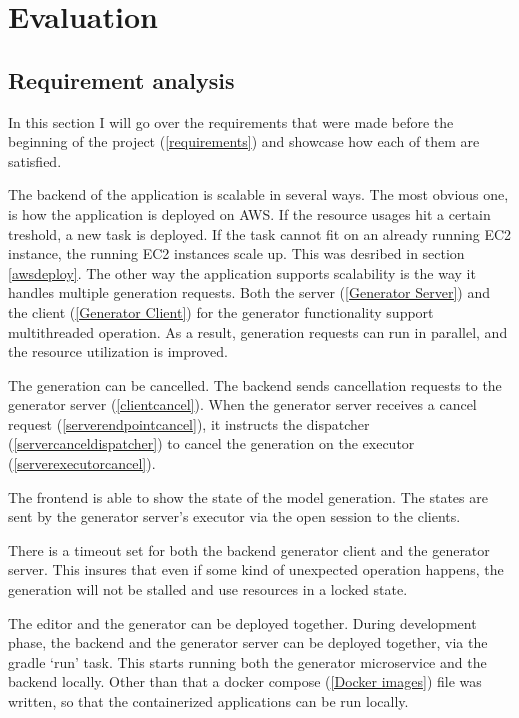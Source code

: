 \chapter{Evaluation}\label{Evaluation}

	\section{Requirement analysis}
	In this section I will go over the requirements that were made before the beginning of the project (\ref{requirements}) 
	and showcase how each of them are satisfied.

	The backend of the application is scalable in several ways. The most obvious one, is how the application is deployed on AWS. 
	If the resource usages hit a certain treshold, a new task is deployed. If the task cannot fit on an already running EC2 instance,
	the running EC2 instances scale up. This was desribed in section \ref{awsdeploy}. The other way the application supports 
	scalability is the way it handles multiple generation requests. Both the server (\ref{Generator Server}) and the client
	(\ref{Generator Client}) for the generator 
	functionality support multithreaded operation. As a result, generation requests can run in parallel, and the resource utilization
	is improved.

	The generation can be cancelled. The backend sends cancellation requests to the generator server (\ref{clientcancel}).
	When the generator server receives a cancel request (\ref{serverendpointcancel}), it instructs the dispatcher 
	(\ref{servercanceldispatcher}) to cancel the generation on the executor (\ref{serverexecutorcancel}).

	The frontend is able to show the state of the model generation. The states are sent by the generator server's executor via
	the open session to the clients.

	There is a timeout set for both the backend generator client and the generator server. This insures that even if some kind of 
	unexpected operation happens, the generation will not be stalled and use resources in a locked state.

	The editor and the generator can be deployed together. During development phase, the backend and the generator server can be 
	deployed together, via the gradle `run' task. This starts running both the generator microservice and the backend locally.
	Other than that a docker compose (\ref{Docker images}) file was written, so that the containerized applications can be run locally.

